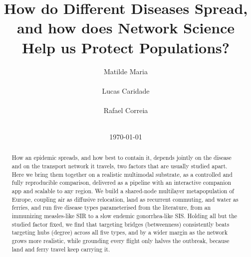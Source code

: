 \documentclass{sigkddExp}
\begin{document}
\title{How do Different Diseases Spread, and how does Network Science Help us Protect Populations?}

\author{
\alignauthor Matilde Maria\\
       \\
\alignauthor Lucas Caridade\\
       \\
\alignauthor Rafael Correia\\
       \\
}

\date{\today}
\maketitle

\begin{abstract}
How an epidemic spreads, and how best to contain it, depends jointly on the disease and on the
transport network it travels, two factors that are usually studied apart. Here we bring them
together on a realistic multimodal substrate, as a controlled and fully reproducible comparison,
delivered as a pipeline with an interactive companion app and scalable to any region. We build a
shared-node multilayer metapopulation of Europe, coupling air as diffusive relocation, land as
recurrent commuting, and water as ferries, and run five disease types parameterised from the
literature, from an immunizing measles-like SIR to a slow endemic gonorrhea-like SIS. Holding all
but the studied factor fixed, we find that targeting bridges (betweenness) consistently beats
targeting hubs (degree) across all five types, and by a wider margin as the network grows more
realistic, while grounding every flight only halves the outbreak, because land and ferry travel
keep carrying it.
\end{abstract}















\end{document}
